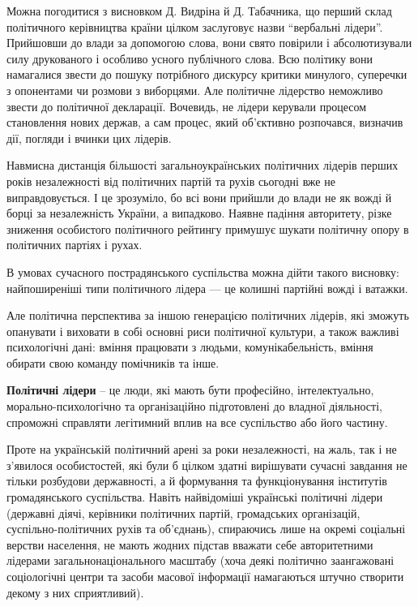 Можна погодитися з висновком Д. Видріна й Д. Табачника, що перший склад політичного керівництва країни цілком заслуговує назви “вербальні лідери”. Прийшовши до влади за допомогою слова, вони свято повірили і абсолютизували силу друкованого і особливо усного публічного слова. Всю політику вони намагалися звести до пошуку потрібного дискурсу критики минулого, суперечки з опонентами чи розмови з виборцями. Але політичне лідерство неможливо звести до політичної декларації. Вочевидь, не лідери керували процесом становлення нових держав, а сам процес, який об’єктивно розпочався, визначив дії, погляди і вчинки цих лідерів.

Навмисна дистанція більшості загальноукраїнських політичних лідерів перших років незалежності від політичних партій та рухів сьогодні вже не виправдовується. І це зрозуміло, бо всі вони прийшли до влади не як вожді й борці за незалежність України, а випадково. Наявне падіння авторитету, різке зниження особистого політичного рейтингу примушує шукати політичну опору в політичних партіях і рухах.

В умовах сучасного пострадянського суспільства можна дійти такого висновку: найпоширеніші типи політичного лідера — це колишні партійні вожді і ватажки.

Але політична перспектива за іншою генерацією політичних лідерів, які зможуть опанувати і виховати в собі основні риси політичної культури, а також важливі психологічні дані: вміння працювати з людьми, комунікабельність, вміння обирати свою команду помічників та інше.

\textbf{Політичні лідери} – це люди, які мають бути професійно, інтелектуально, морально-психологічно та організаційно підготовлені до владної діяльності, спроможні справляти легітимний вплив на все суспільство або його частину.

Проте на українській політичний арені за роки незалежності, на жаль, так і не з’явилося особистостей, які були б цілком здатні вирішувати сучасні завдання не тільки розбудови державності, а й формування та функціонування інститутів громадянського суспільства. Навіть найвідоміші українські політичні лідери (державні діячі, керівники політичних партій, громадських організацій, суспільно-політичних рухів та об’єднань), спираючись лише на окремі соціальні верстви населення, не мають жодних підстав вважати себе авторитетними лідерами загальнонаціонального масштабу (хоча деякі політично заангажовані соціологічні центри та засоби масової інформації намагаються штучно створити декому з них сприятливий).

